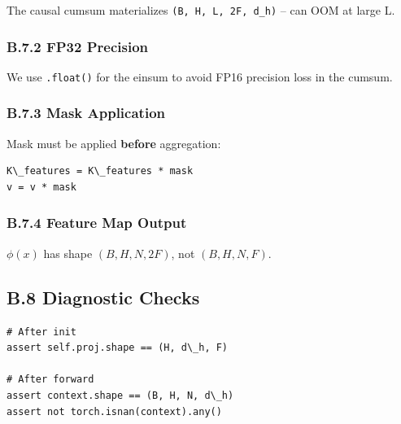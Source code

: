 The causal cumsum materializes \texttt{(B, H, L, 2F, d\_h)} -- can OOM at 
large L.

\subsubsection{B.7.2 FP32 Precision}

We use \texttt{.float()} for the einsum to avoid FP16 precision loss in the 
cumsum.

\subsubsection{B.7.3 Mask Application}

Mask must be applied \textbf{before} aggregation:

\begin{lstlisting}
K\_features = K\_features * mask
v = v * mask
\end{lstlisting}

\subsubsection{B.7.4 Feature Map Output}

$\phi(x)$ has shape $(B, H, N, 2F)$, not $(B, H, N, F)$.

\subsection{B.8 Diagnostic Checks}

\begin{lstlisting}
# After init
assert self.proj.shape == (H, d\_h, F)

# After forward
assert context.shape == (B, H, N, d\_h)
assert not torch.isnan(context).any()
\end{lstlisting}


